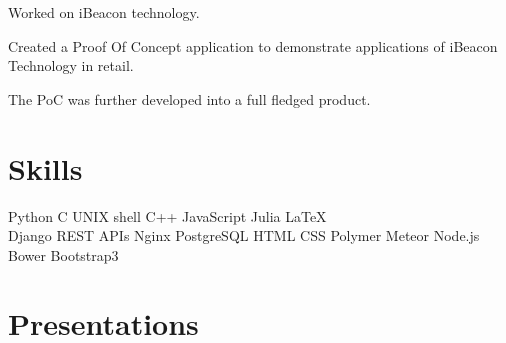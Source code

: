 \documentclass[]{deedy-resume-openfont}
\begin{document}
\begin{minipage}[t]{0.48\textwidth}
\begin{tightemize}
\item Worked on iBeacon technology.
\item Created a Proof Of Concept application to demonstrate applications of iBeacon Technology in retail.
\item The PoC was further developed into a full fledged product.
\end{tightemize}

\section{Skills}
 Python \textbullet{} C \textbullet{} UNIX shell \textbullet{} C++ \textbullet{} JavaScript \textbullet{} Julia \textbullet{} \LaTeX\\
 Django \textbullet{} REST APIs \textbullet{} Nginx \textbullet PostgreSQL \textbullet  HTML \textbullet{} CSS \textbullet{} Polymer \textbullet Meteor \textbullet Node.js \textbullet Bower \textbullet Bootstrap3 
\section{Presentations}


\end{minipage} 
\hfill
\end{document}

